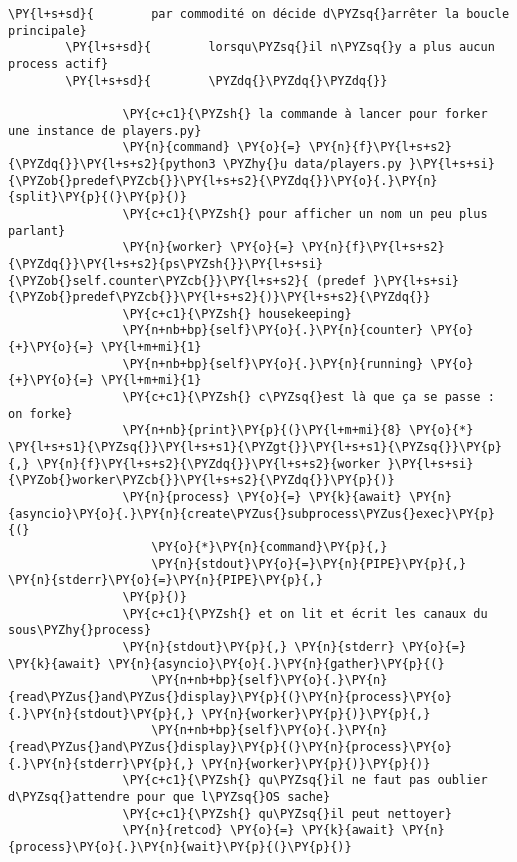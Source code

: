 \begin{Verbatim}[commandchars=\\\{\},frame=single,framerule=0.3mm,rulecolor=\color{cellframecolor}]
        \PY{l+s+sd}{        par commodité on décide d\PYZsq{}arrêter la boucle principale}
        \PY{l+s+sd}{        lorsqu\PYZsq{}il n\PYZsq{}y a plus aucun process actif}
        \PY{l+s+sd}{        \PYZdq{}\PYZdq{}\PYZdq{}}
        
                \PY{c+c1}{\PYZsh{} la commande à lancer pour forker une instance de players.py}
                \PY{n}{command} \PY{o}{=} \PY{n}{f}\PY{l+s+s2}{\PYZdq{}}\PY{l+s+s2}{python3 \PYZhy{}u data/players.py }\PY{l+s+si}{\PYZob{}predef\PYZcb{}}\PY{l+s+s2}{\PYZdq{}}\PY{o}{.}\PY{n}{split}\PY{p}{(}\PY{p}{)}
                \PY{c+c1}{\PYZsh{} pour afficher un nom un peu plus parlant}
                \PY{n}{worker} \PY{o}{=} \PY{n}{f}\PY{l+s+s2}{\PYZdq{}}\PY{l+s+s2}{ps\PYZsh{}}\PY{l+s+si}{\PYZob{}self.counter\PYZcb{}}\PY{l+s+s2}{ (predef }\PY{l+s+si}{\PYZob{}predef\PYZcb{}}\PY{l+s+s2}{)}\PY{l+s+s2}{\PYZdq{}}
                \PY{c+c1}{\PYZsh{} housekeeping}
                \PY{n+nb+bp}{self}\PY{o}{.}\PY{n}{counter} \PY{o}{+}\PY{o}{=} \PY{l+m+mi}{1}
                \PY{n+nb+bp}{self}\PY{o}{.}\PY{n}{running} \PY{o}{+}\PY{o}{=} \PY{l+m+mi}{1}
                \PY{c+c1}{\PYZsh{} c\PYZsq{}est là que ça se passe : on forke}
                \PY{n+nb}{print}\PY{p}{(}\PY{l+m+mi}{8} \PY{o}{*} \PY{l+s+s1}{\PYZsq{}}\PY{l+s+s1}{\PYZgt{}}\PY{l+s+s1}{\PYZsq{}}\PY{p}{,} \PY{n}{f}\PY{l+s+s2}{\PYZdq{}}\PY{l+s+s2}{worker }\PY{l+s+si}{\PYZob{}worker\PYZcb{}}\PY{l+s+s2}{\PYZdq{}}\PY{p}{)}
                \PY{n}{process} \PY{o}{=} \PY{k}{await} \PY{n}{asyncio}\PY{o}{.}\PY{n}{create\PYZus{}subprocess\PYZus{}exec}\PY{p}{(}
                    \PY{o}{*}\PY{n}{command}\PY{p}{,}
                    \PY{n}{stdout}\PY{o}{=}\PY{n}{PIPE}\PY{p}{,} \PY{n}{stderr}\PY{o}{=}\PY{n}{PIPE}\PY{p}{,}
                \PY{p}{)}
                \PY{c+c1}{\PYZsh{} et on lit et écrit les canaux du sous\PYZhy{}process}
                \PY{n}{stdout}\PY{p}{,} \PY{n}{stderr} \PY{o}{=} \PY{k}{await} \PY{n}{asyncio}\PY{o}{.}\PY{n}{gather}\PY{p}{(}
                    \PY{n+nb+bp}{self}\PY{o}{.}\PY{n}{read\PYZus{}and\PYZus{}display}\PY{p}{(}\PY{n}{process}\PY{o}{.}\PY{n}{stdout}\PY{p}{,} \PY{n}{worker}\PY{p}{)}\PY{p}{,}
                    \PY{n+nb+bp}{self}\PY{o}{.}\PY{n}{read\PYZus{}and\PYZus{}display}\PY{p}{(}\PY{n}{process}\PY{o}{.}\PY{n}{stderr}\PY{p}{,} \PY{n}{worker}\PY{p}{)}\PY{p}{)}
                \PY{c+c1}{\PYZsh{} qu\PYZsq{}il ne faut pas oublier d\PYZsq{}attendre pour que l\PYZsq{}OS sache}
                \PY{c+c1}{\PYZsh{} qu\PYZsq{}il peut nettoyer}
                \PY{n}{retcod} \PY{o}{=} \PY{k}{await} \PY{n}{process}\PY{o}{.}\PY{n}{wait}\PY{p}{(}\PY{p}{)}

\end{Verbatim}
